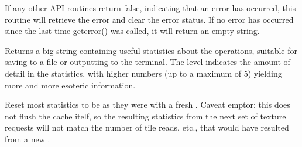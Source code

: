 If any other API routines return {\cf false}, indicating that an error
has occurred, this routine will retrieve the error and clear the error
status.  If no error has occurred since the last time {\cf geterror()}
was called, it will return an empty string.
\apiend

Returns a big string containing useful statistics about the \ImageCache
operations, suitable for saving to a file or outputting to the terminal.
The {\cf level} indicates the amount of detail in the statistics,
with higher numbers (up to a maximum of 5) yielding more and more
esoteric information.
\apiend

Reset most statistics to be as they were with a fresh
\TextureSystem.  Caveat emptor: this does not flush the cache
itelf, so the resulting statistics from the next set of texture
requests will not match the number of tile reads, etc., that
would have resulted from a new \TextureSystem.
\apiend



\chapwidthend

